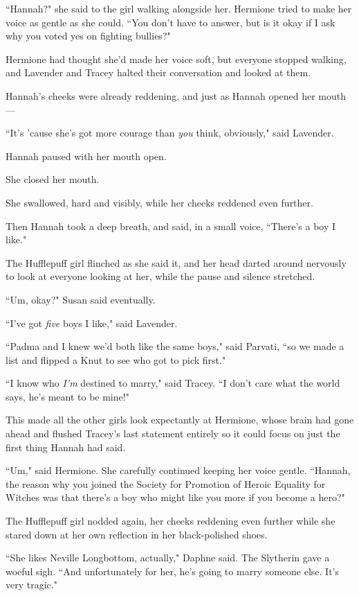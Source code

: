 ``Hannah?" she said to the girl walking alongside her. Hermione tried to make her voice as gentle as she could. ``You don't have to answer, but is it okay if I ask why you voted yes on fighting bullies?"

Hermione had thought she'd made her voice soft, but everyone stopped walking, and Lavender and Tracey halted their conversation and looked at them.

Hannah's cheeks were already reddening, and just as Hannah opened her mouth—

``It's 'cause she's got more courage than \emph{you} think, obviously," said Lavender.

Hannah paused with her mouth open.

She closed her mouth.

She swallowed, hard and visibly, while her cheeks reddened even further.

Then Hannah took a deep breath, and said, in a small voice, ``There's a boy I like."

The Hufflepuff girl flinched as she said it, and her head darted around nervously to look at everyone looking at her, while the pause and silence stretched.

``Um, okay?" Susan said eventually.

``I've got \emph{five} boys I like," said Lavender.

``Padma and I knew we'd both like the same boys," said Parvati, ``so we made a list and flipped a Knut to see who got to pick first."

``I know who \emph{I'm} destined to marry," said Tracey. ``I don't care what the world says, he's meant to be mine!"

This made all the other girls look expectantly at Hermione, whose brain had gone ahead and flushed Tracey's last statement entirely so it could focus on just the first thing Hannah had said.

``Um," said Hermione. She carefully continued keeping her voice gentle. ``Hannah, the reason why you joined the Society for Promotion of Heroic Equality for Witches was that there's a boy who might like you more if you become a hero?"

The Hufflepuff girl nodded again, her cheeks reddening even further while she stared down at her own reflection in her black-polished shoes.

``She likes Neville Longbottom, actually," Daphne said. The Slytherin gave a woeful sigh. ``And unfortunately for her, he's going to marry someone else. It's very tragic."

